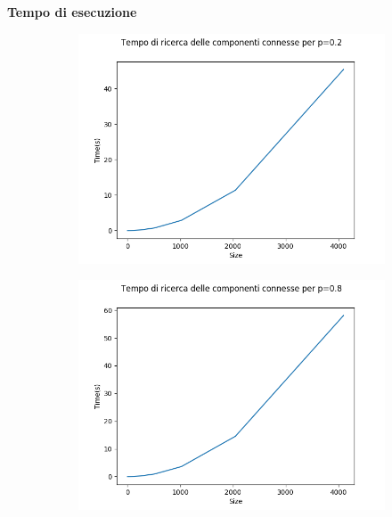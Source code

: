 \documentclass[]{article}
\begin{document}
\textbf{Tempo di esecuzione}\\
\begin{figure}[H]
    \centering
    \begin{subfigure}[b]{0.45\linewidth} 
        \centering
        \includegraphics[width=\textwidth]{cc_time_p=02}
        \label{fig:quick_casuale}
    \end{subfigure}
    \quad
    \begin{subfigure}[b]{0.45\linewidth}
        \centering
        \includegraphics[width=\textwidth]{cc_time_p=08}
        \label{fig:quick_best}
    \end{subfigure}
\end{figure}
\end{document}
